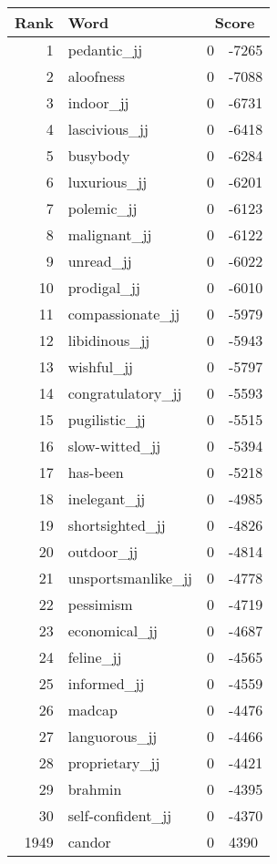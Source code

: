 \begin{longtable}[!htbp]{| rlr@{.}l |}
    \hline
    \textbf{Rank} & \textbf{Word} & \multicolumn{2}{c|}{\textbf{Score}} \\
    \hline
    \endhead
    1 & pedantic\_jj & 0 & -7265 \\
    2 & aloofness & 0 & -7088 \\
    3 & indoor\_jj & 0 & -6731 \\
    4 & lascivious\_jj & 0 & -6418 \\
    5 & busybody & 0 & -6284 \\
    6 & luxurious\_jj & 0 & -6201 \\
    7 & polemic\_jj & 0 & -6123 \\
    8 & malignant\_jj & 0 & -6122 \\
    9 & unread\_jj & 0 & -6022 \\
    10 & prodigal\_jj & 0 & -6010 \\
    11 & compassionate\_jj & 0 & -5979 \\
    12 & libidinous\_jj & 0 & -5943 \\
    13 & wishful\_jj & 0 & -5797 \\
    14 & congratulatory\_jj & 0 & -5593 \\
    15 & pugilistic\_jj & 0 & -5515 \\
    16 & slow-witted\_jj & 0 & -5394 \\
    17 & has-been & 0 & -5218 \\
    18 & inelegant\_jj & 0 & -4985 \\
    19 & shortsighted\_jj & 0 & -4826 \\
    20 & outdoor\_jj & 0 & -4814 \\
    21 & unsportsmanlike\_jj & 0 & -4778 \\
    22 & pessimism & 0 & -4719 \\
    23 & economical\_jj & 0 & -4687 \\
    24 & feline\_jj & 0 & -4565 \\
    25 & informed\_jj & 0 & -4559 \\
    26 & madcap & 0 & -4476 \\
    27 & languorous\_jj & 0 & -4466 \\
    28 & proprietary\_jj & 0 & -4421 \\
    29 & brahmin & 0 & -4395 \\
    30 & self-confident\_jj & 0 & -4370 \\
    1949 & candor & 0 & 4390 \\

\end{longtable}
